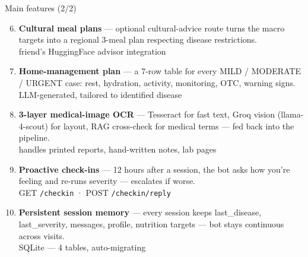 \documentclass[aspectratio=169,11pt]{beamer}
\begin{document}
\begin{frame}{Main features (2/2)}
  \footnotesize
  \begin{enumerate}\setcounter{enumi}{5}
    \item \textbf{Cultural meal plans} --- optional cultural-advice route turns the macro targets into a regional 3-meal plan respecting disease restrictions.\\
          {\scriptsize friend's HuggingFace advisor integration}
    \item \textbf{Home-management plan} --- a 7-row table for every MILD / MODERATE / URGENT case: rest, hydration, activity, monitoring, OTC, warning signs.\\
          {\scriptsize LLM-generated, tailored to identified disease}
    \item \textbf{3-layer medical-image OCR} --- Tesseract for fast text, Groq vision (llama-4-scout) for layout, RAG cross-check for medical terms --- fed back into the pipeline.\\
          {\scriptsize handles printed reports, hand-written notes, lab pages}
    \item \textbf{Proactive check-ins} --- 12 hours after a session, the bot asks how you're feeling and re-runs severity --- escalates if worse.\\
          {\scriptsize GET \texttt{/checkin} · POST \texttt{/checkin/reply}}
    \item \textbf{Persistent session memory} --- every session keeps last\_disease, last\_severity, messages, profile, nutrition targets --- bot stays continuous across visits.\\
          {\scriptsize SQLite --- 4 tables, auto-migrating}
  \end{enumerate}
\end{frame}
\end{document}
